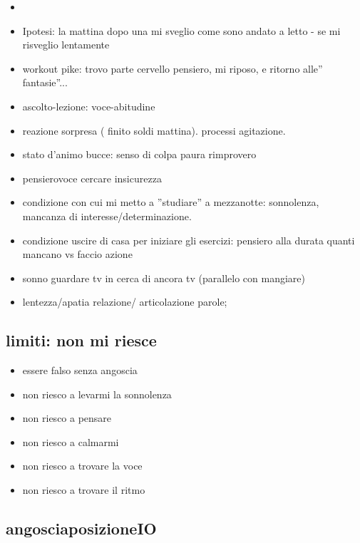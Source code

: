 \begin{itemize}
\item {}
\item Ipotesi: la mattina dopo una  mi sveglio come sono andato a letto - se  mi risveglio lentamente
\item workout pike: trovo parte cervello pensiero, mi riposo, e ritorno alle'' fantasie''...
\item ascolto-lezione: voce-abitudine
\item reazione sorpresa ( finito soldi mattina). processi agitazione.
\item stato d'animo bucce: senso di colpa paura rimprovero
\item pensierovoce cercare insicurezza
\item condizione con cui  mi metto a ''studiare'' a mezzanotte: sonnolenza, mancanza di interesse/determinazione.
\item condizione uscire di casa per iniziare gli esercizi: pensiero alla durata quanti mancano vs faccio azione
\item sonno guardare tv in cerca di ancora tv (parallelo con mangiare)
\item lentezza/apatia relazione/ articolazione parole;
\end{itemize}

\subsection{limiti: non mi riesce}

\begin{itemize}
\item essere falso senza angoscia
\item non riesco a levarmi la sonnolenza
\item non riesco a pensare
\item non riesco a calmarmi
\item non riesco a trovare la voce
\item non riesco a trovare il ritmo
\end{itemize}

\subsection{angosciaposizioneIO}

